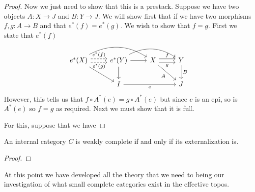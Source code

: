 \begin{proof}
  Now we just need to show that this is a prestack. Suppose we have
  two objects $A : X \to J$ and $B : Y \to J$. We will show first that
  if we have two morphisms $f, g : A \to B$ and that
  $e^*(f) = e^*(g)$. We wish to show that $f = g$. First we state that
  $e^*(f)$
  \[
    \begin{tikzcd}
      e^*(X) \ar[dr] \ar[rr, bend left] \ar[r, dashed, shift left=.25em, "e^*(f)"] \ar[r, dashed, swap, shift right=.25em, "e^*(g)"] &
      e^*(Y) \ar[d] \ar[r] \ar[bend left, rr] &
      X \ar[dr, swap, "A"] \ar[r, shift left=.25em, "f"] \ar[r, shift right=.25em, swap, "g"] &
      Y \ar[d, "B"]\\
      & I \ar[rr, swap, "e"] & & J
    \end{tikzcd}
  \]
  However, this tells us that $f \circ A^*(e) = g \circ A^*(e)$ but
  since $e$ is an epi, so is $A^*(e)$ so $f = g$ as required. Next we
  must show that it is full.

  For this, suppose that we have

\end{proof}

\begin{thm}\label{thm:complete:completeexternalization}
  An internal category $C$ is weakly complete if and only if its
  externalization is.
\end{thm}
\begin{proof}

\end{proof}
At this point we have developed all the theory that we need to being
our investigation of what small complete categories exist in the
effective topos.

